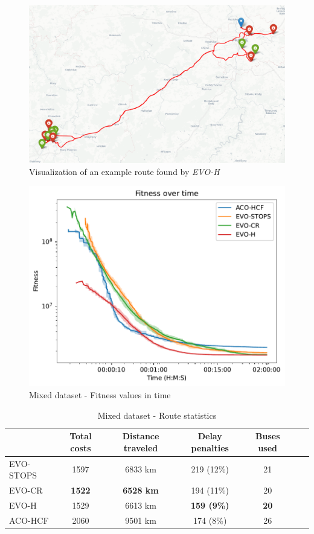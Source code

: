 \begin{figure}[hb]
    \centering
    \includegraphics[width=1\linewidth]{img/mixedroutevis.png}
    \caption{Visualization of an example route found by \textit{EVO-H}}
    \label{fig:mixed_route_visualization}
\end{figure}

\clearpage

\begin{figure}
    \centering
    \includegraphics[width=1\linewidth]
    {img/exp_mixed_100_time.pdf}
    \caption{Mixed dataset - Fitness values in time}
    \label{fig:exp_mixed}
\end{figure}

\begin{table}
    \centering
    \begin{tabular}{lcccccc}
         & Total costs & Distance traveled & Delay penalties & Buses used \\
         \hline
         EVO-STOPS & 1597 & 6833 km & 219 (12\%) & 21 \\
         EVO-CR & \textbf{1522} & \textbf{6528 km} & 194 (11\%) & 20 \\
         EVO-H & 1529 & 6613 km & \textbf{159 (9\%)} & \textbf{20} \\
         ACO-HCF & 2060 & 9501 km & 174 (8\%) & 26 \\
    \end{tabular}
    \caption{Mixed dataset - Route statistics}
    \label{tab:exp_mixed_route_stats}
\end{table}

